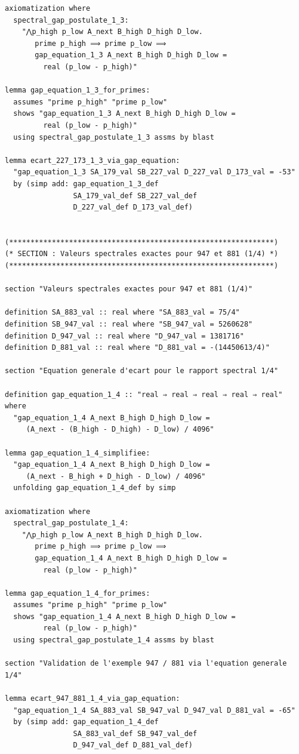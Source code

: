\documentclass[a4paper,11pt]{article}
\begin{document}
\begin{holcode}[title={\textcolor{white}{Fichier : methode\_spectral.thy -- Partie 6/6 (FIN)}}]
\begin{lstlisting}
axiomatization where
  spectral_gap_postulate_1_3:
    "⋀p_high p_low A_next B_high D_high D_low.
       prime p_high ⟹ prime p_low ⟹
       gap_equation_1_3 A_next B_high D_high D_low =
         real (p_low - p_high)"

lemma gap_equation_1_3_for_primes:
  assumes "prime p_high" "prime p_low"
  shows "gap_equation_1_3 A_next B_high D_high D_low =
         real (p_low - p_high)"
  using spectral_gap_postulate_1_3 assms by blast

lemma ecart_227_173_1_3_via_gap_equation:
  "gap_equation_1_3 SA_179_val SB_227_val D_227_val D_173_val = -53"
  by (simp add: gap_equation_1_3_def
                SA_179_val_def SB_227_val_def
                D_227_val_def D_173_val_def)


(**************************************************************)
(* SECTION : Valeurs spectrales exactes pour 947 et 881 (1/4) *)
(**************************************************************)

section "Valeurs spectrales exactes pour 947 et 881 (1/4)"

definition SA_883_val :: real where "SA_883_val = 75/4"
definition SB_947_val :: real where "SB_947_val = 5260628"
definition D_947_val :: real where "D_947_val = 1381716"
definition D_881_val :: real where "D_881_val = -(14450613/4)"

section "Equation generale d'ecart pour le rapport spectral 1/4"

definition gap_equation_1_4 :: "real ⇒ real ⇒ real ⇒ real ⇒ real" where
  "gap_equation_1_4 A_next B_high D_high D_low =
     (A_next - (B_high - D_high) - D_low) / 4096"

lemma gap_equation_1_4_simplifiee:
  "gap_equation_1_4 A_next B_high D_high D_low =
     (A_next - B_high + D_high - D_low) / 4096"
  unfolding gap_equation_1_4_def by simp

axiomatization where
  spectral_gap_postulate_1_4:
    "⋀p_high p_low A_next B_high D_high D_low.
       prime p_high ⟹ prime p_low ⟹
       gap_equation_1_4 A_next B_high D_high D_low =
         real (p_low - p_high)"

lemma gap_equation_1_4_for_primes:
  assumes "prime p_high" "prime p_low"
  shows "gap_equation_1_4 A_next B_high D_high D_low =
         real (p_low - p_high)"
  using spectral_gap_postulate_1_4 assms by blast

section "Validation de l'exemple 947 / 881 via l'equation generale 1/4"

lemma ecart_947_881_1_4_via_gap_equation:
  "gap_equation_1_4 SA_883_val SB_947_val D_947_val D_881_val = -65"
  by (simp add: gap_equation_1_4_def
                SA_883_val_def SB_947_val_def
                D_947_val_def D_881_val_def)


\end{lstlisting}
\end{holcode}
\end{document}

